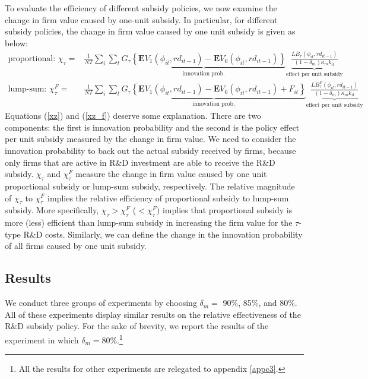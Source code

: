\documentclass[11pt]{article}
\begin{document}
To evaluate the efficiency of different subsidy policies, we now examine the change in firm value caused by one-unit subsidy. In particular, for different subsidy policies, the change in firm value caused by one unit subsidy is given as below:
\begin{align}
\text{proportional: } \chi_\tau=&\frac{1}{NT}\sum_i \sum_t \underbrace{G_\tau\left\{\mathbf{E}V_1(\phi_{it}, rd_{it-1})-\mathbf{E}V_0(\phi_{it}, rd_{it-1})\right\}}_\text{innovation prob.} \underbrace{\frac{LB_{\tau}(\phi_{it}, rd_{it-1})}{(1-\delta_m)\kappa_m k_{it}}}_\text{effect per unit subsidy}\label{xz} \\ 
\text{lump-sum: }\chi_{\tau}^F=&\frac{1}{NT}\sum_i\sum_t \underbrace{G_\tau\left\{\mathbf{E}V_1(\phi_{it}, rd_{it-1})-\mathbf{E}V_0(\phi_{it}, rd_{it-1})+F_{it}\right\}}_\text{innovation prob.}\underbrace{\frac{LB_{\tau}^F(\phi_{it}, rd_{it-1})}{(1-\delta_m)\kappa_m k_{it}}}_\text{effect per unit subsidy} \label{xz_f}
\end{align}
Equations (\ref{xz}) and (\ref{xz_f}) deserve some explanation. There are two components: the first is innovation probability and the second is the policy effect per unit subsidy measured by the change in firm value. We need to consider the innovation probability to back out the actual subsidy received by firms, because only firms that are active in R\&D investment are able to receive the R\&D subsidy. $\chi_\tau$ and $\chi_\tau^F$ measure the change in firm value caused by one unit proportional subsidy or lump-sum subsidy, respectively. The relative magnitude of $\chi_\tau$ to $\chi_\tau^F$ implies the relative efficiency of proportional subsidy to lump-sum subsidy. More specifically, $\chi_\tau>\chi_\tau^F$ ($<\chi_\tau^F)$ implies that proportional subsidy is more (less) efficient than lump-sum subsidy in increasing the firm value for the $\tau$-type R\&D costs. Similarly, we can define the change in the innovation probability of all firms caused by one unit subsidy.

\subsection{Results} 
We conduct three groups of experiments by choosing $\delta_{m}=$ 90\%, 85\%, and 80\%. All of these experiments display similar results on the relative effectiveness of the R\&D subsidy policy. For the sake of brevity, we report the results of the experiment in which $\delta_{m}=80\%$.\footnote{All the results for other experiments are relegated to appendix \ref{appc3}.} 
\end{document}
